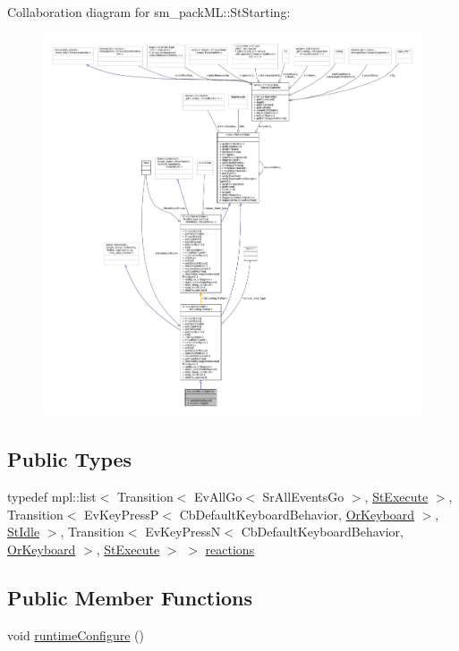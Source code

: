 Collaboration diagram for sm\+\_\+pack\+ML\+:\+:St\+Starting\+:
\nopagebreak
\begin{figure}[H]
\begin{center}
\leavevmode
\includegraphics[width=350pt]{structsm__packML_1_1StStarting__coll__graph}
\end{center}
\end{figure}
\subsection*{Public Types}
\begin{DoxyCompactItemize}
\item 
typedef mpl\+::list$<$ Transition$<$ Ev\+All\+Go$<$ Sr\+All\+Events\+Go $>$, \hyperlink{structsm__packML_1_1StExecute}{St\+Execute} $>$, Transition$<$ Ev\+Key\+PressP$<$ Cb\+Default\+Keyboard\+Behavior, \hyperlink{classsm__packML_1_1OrKeyboard}{Or\+Keyboard} $>$, \hyperlink{structsm__packML_1_1StIdle}{St\+Idle} $>$, Transition$<$ Ev\+Key\+PressN$<$ Cb\+Default\+Keyboard\+Behavior, \hyperlink{classsm__packML_1_1OrKeyboard}{Or\+Keyboard} $>$, \hyperlink{structsm__packML_1_1StExecute}{St\+Execute} $>$ $>$ \hyperlink{structsm__packML_1_1StStarting_a1479e976adda40e56599f8587ba6fd69}{reactions}
\end{DoxyCompactItemize}
\subsection*{Public Member Functions}
\begin{DoxyCompactItemize}
\item 
void \hyperlink{structsm__packML_1_1StStarting_a5fa3513fd8240842dbad5d1c0c101949}{runtime\+Configure} ()
\end{DoxyCompactItemize}
